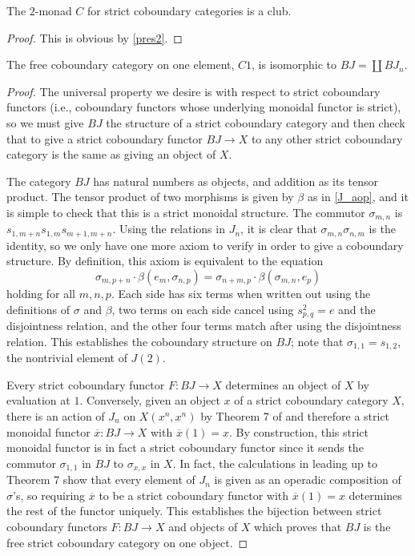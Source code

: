 \begin{lem}
The $2$-monad $C$ for strict coboundary categories is a club.
\end{lem}
\begin{proof}
This is obvious by \cref{pres2}.
\end{proof}

\begin{thm}
The free coboundary category on one element, $C1$, is isomorphic to $BJ = \coprod BJ_{n}$.
\end{thm}
\begin{proof}
The universal property we desire is with respect to strict coboundary functors (i.e., coboundary functors whose underlying monoidal functor is strict), so we must give $BJ$ the structure of a strict coboundary category and then check that to give a strict coboundary functor $BJ \rightarrow X$ to any other strict coboundary category is the same as giving an object of $X$.

The category $BJ$ has natural numbers as objects, and addition as its tensor product. The tensor product of two morphisms is given by $\beta$ as in \cref{J_aop}, and it is simple to check that this is a strict monoidal structure. The commutor $\sigma_{m,n}$ is $s_{1, m+n}s_{1,m}s_{m+1,m+n}$. Using the relations in $J_{n}$, it is clear that $\sigma_{m,n}\sigma_{n,m}$ is the identity, so we only have one more axiom to verify in order to give a coboundary structure. By definition, this axiom is equivalent to the equation
  \[
    \sigma_{m, p+n}\cdot \beta(e_{m}, \sigma_{n,p}) = \sigma_{n+m,p}\cdot \beta(\sigma_{m,n},e_{p})
  \]
holding for all $m,n,p$. Each side has six terms when written out using the definitions of $\sigma$ and $\beta$, two terms on each side cancel using $s_{p,q}^{2} = e$ and the disjointness relation, and the other four terms match after using the disjointness relation. This establishes the coboundary structure on $BJ$; note that $\sigma_{1,1} = s_{1,2}$, the nontrivial element of $J(2)$.

Every strict coboundary functor $F \colon BJ \rightarrow X$ determines an object of $X$ by evaluation at $1$. Conversely, given an object $x$ of a strict coboundary category $X$, there is an action of $J_{n}$ on $X(x^{n},x^{n})$ by Theorem 7 of \cite{hk-cobound} and therefore a strict monoidal functor $\overline{x} \colon BJ \rightarrow X$ with $\overline{x}(1) = x$. By construction, this strict monoidal functor is in fact a strict coboundary functor since it sends the commutor $\sigma_{1,1}$ in $BJ$ to $\sigma_{x,x}$ in $X$. In fact, the calculations in \cite{hk-cobound} leading up to Theorem 7 show that every element of $J_{n}$ is given as an operadic composition of $\sigma$'s, so requiring $\overline{x}$ to be a strict coboundary functor with $\overline{x}(1) = x$ determines the rest of the functor uniquely. This establishes the bijection between strict coboundary functors $F \colon BJ \rightarrow X$ and objects of $X$ which proves that $BJ$ is the free strict coboundary category on one object.
\end{proof}


